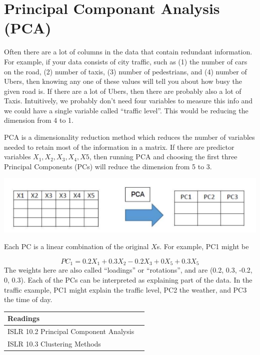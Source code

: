 \documentclass[openany]{book}
\begin{document}
\hypertarget{principal-componant-analysis-pca}{%
\section{Principal Componant Analysis (PCA)}\label{principal-componant-analysis-pca}}

Often there are a lot of columns in the data that contain redundant information. For example, if your data consists of city traffic, such as (1) the number of cars on the road, (2) number of taxis, (3) number of pedestrians, and (4) number of Ubers, then knowing any one of these values will tell you about how busy the given road is. If there are a lot of Ubers, then there are probably also a lot of Taxis. Intuitively, we probably don't need four variables to measure this info and we could have a single variable called ``traffic level''. This would be reducing the dimension from 4 to 1.

PCA is a dimensionality reduction method which reduces the number of variables needed to retain most of the information in a matrix. If there are predictor variables \(X_1, X_2, X_3, X_4, X5\), then running PCA and choosing the first three Principal Components (PCs) will reduce the dimension from 5 to 3.

\begin{center}\includegraphics[width=10.47in]{images/PCA} \end{center}

Each PC is a linear combination of the original \(X\)s. For example, PC1 might be

\[PC_1 = 0.2X_1 + 0.3X_2 - 0.2X_3 + 0X_5 + 0.3X_5\]
The weights here are also called ``loadings'' or ``rotations'', and are (0.2, 0.3, -0.2, 0, 0.3). Each of the PCs can be interpreted as explaining part of the data. In the traffic example, PC1 might explain the traffic level, PC2 the weather, and PC3 the time of day.

\begin{longtable}[]{@{}ll@{}}
\toprule
Readings &\tabularnewline
\midrule
\endhead
ISLR 10.2 Principal Component Analysis &\tabularnewline
ISLR 10.3 Clustering Methods &\tabularnewline
\bottomrule
\end{longtable}
\end{document}
